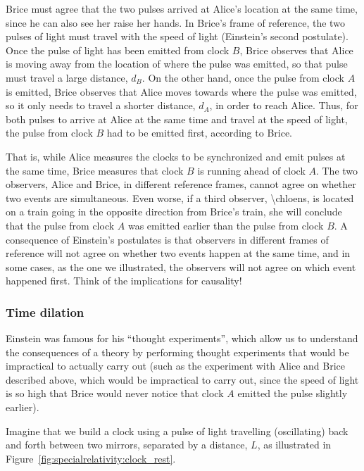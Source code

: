 Brice must agree that the two pulses arrived at Alice's location at the same time, since he can also see her raise her hands. In Brice's frame of reference, the two pulses of light must travel with the speed of light (Einstein's second postulate). Once the pulse of light has been emitted from clock $B$, Brice observes that Alice is moving away from the location of where the pulse was emitted, so that pulse must travel a large distance, $d_B$. On the other hand, once the pulse from clock $A$ is emitted, Brice observes that Alice moves towards where the pulse was emitted, so it only needs to travel a shorter distance, $d_A$, in order to reach Alice. Thus, for both pulses to arrive at Alice at the same time and travel at the speed of light, the pulse from clock $B$ had to be emitted first, according to Brice.

That is, while Alice measures the clocks to be synchronized and emit pulses at the same time, Brice measures that clock $B$ is running ahead of clock $A$. The two observers, Alice and Brice, in different reference frames, cannot agree on whether two events are simultaneous. Even worse, if a third observer, {\textbackslash}chloens, is located on a train going in the opposite direction from Brice's train, she will conclude that the pulse from clock $A$ was emitted earlier than the pulse from clock $B$. A consequence of Einstein's postulates is that observers in different frames of reference will not agree on whether two events happen at the same time, and in some cases, as the one we illustrated, the observers will not agree on which event happened first. Think of the implications for causality!

\subsubsection{Time dilation}

Einstein was famous for his ``thought experiments'', which allow us to understand the consequences of a theory by performing thought experiments that would be impractical to actually carry out (such as the experiment with Alice and Brice described above, which would be impractical to carry out, since the speed of light is so high that Brice would never notice that clock $A$ emitted the pulse slightly earlier).

Imagine that we build a clock using a pulse of light travelling (oscillating) back and forth between two mirrors, separated by a distance, $L$, as illustrated in Figure~\ref{fig:specialrelativity:clock_rest}.

